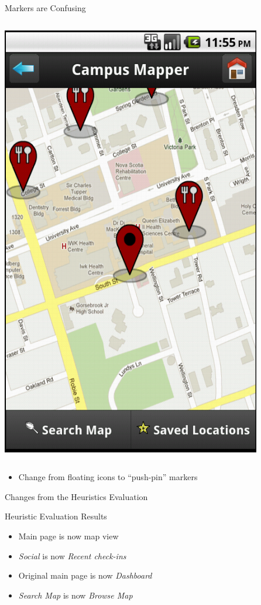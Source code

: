 \documentclass{beamer}
\begin{document}
\begin{frame}{Markers are Confusing}
\begin{columns}[c]
        \center\includegraphics[height=0.5 \textheight]{pre-heuristic/map-restaurant.png}
    \end{columns}
    \begin{itemize}
        \item Change from floating icons to ``push-pin'' markers
    \end{itemize}
\end{frame}

\begin{frame}{Changes from the Heuristics Evaluation}
    \begin{block}{Heuristic Evaluation Results} 
    \begin{itemize}
        \item Main page is now map view
        \item \emph{Social} is now \emph{Recent check-ins}
        \item Original main page is now \emph{Dashboard}
        \item \emph{Search Map} is now \emph{Browse Map}
    \end{itemize}
    \end{block}
\end{frame}
\end{document}
